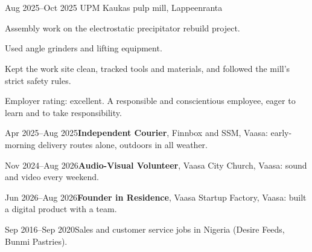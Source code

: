 \documentclass[a4paper,11pt]{article}
\begin{document}
\section{}
\begin{cventry}{Aug 2025--Oct 2025}{}
  UPM Kaukas pulp mill, Lappeenranta\par
  Assembly work on the electrostatic precipitator rebuild project.\par
  Used angle grinders and lifting equipment.\par
  Kept the work site clean, tracked tools and materials, and followed the mill's strict safety rules.\par
  Employer rating: excellent. A responsible and conscientious employee, eager to learn and to take responsibility.
\end{cventry}
\begin{cventry}{Apr 2025--Aug 2025}{\textbf{Independent Courier}, Finnbox and SSM, Vaasa: early-morning delivery routes alone, outdoors in all weather.}
\end{cventry}
\begin{cventry}{Nov 2024--Aug 2026}{\textbf{Audio-Visual Volunteer}, Vaasa City Church, Vaasa: sound and video every weekend.}
\end{cventry}
\begin{cventry}{Jun 2026--Aug 2026}{\textbf{Founder in Residence}, Vaasa Startup Factory, Vaasa: built a digital product with a team.}
\end{cventry}
\begin{cventry}{Sep 2016--Sep 2020}{Sales and customer service jobs in Nigeria (Desire Feeds, Bunmi Pastries).}
\end{cventry}

\section{}

\section{}
\end{document}
